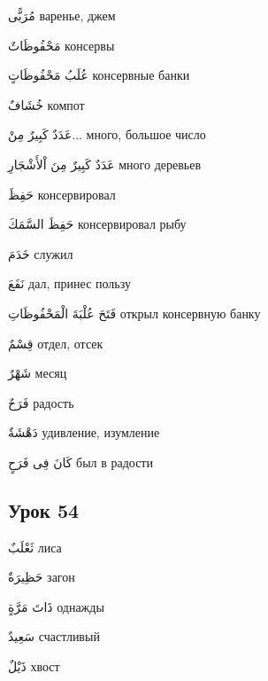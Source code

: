 \documentclass[a5paper]{article}
\newcommand\textstyleDropCaps[1]{#1}
\newcommand\textstyleCaptioncharacters[1]{#1}
\begin{document}
\textstyleCaptioncharacters{مُرَبًّى }\textstyleDropCaps{варенье, джем‎}

\textstyleCaptioncharacters{مَحْفُوظَاتٌ }\textstyleDropCaps{консервы‎}

\textstyleCaptioncharacters{عُلَبُ مَحْفُوظَاتٍ }\textstyleDropCaps{кон­сервные банки‎}

\textstyleCaptioncharacters{خُشَافٌ }\textstyleDropCaps{компот‎}

\textstyleCaptioncharacters{عَدَدٌ كَبِيرٌ مِنْ...ِ }\textstyleDropCaps{много, большое число‎}

\textstyleCaptioncharacters{عَدَدٌ كَبِيرٌ مِنَ اْلأَشْجَارِ }\textstyleDropCaps{много деревьев‎}

\textstyleCaptioncharacters{حَفِظَ }\textstyleDropCaps{консервировал‎}

\textstyleCaptioncharacters{حَفِظَ السَّمَكَ }\textstyleDropCaps{консер­вировал рыбу‎}

\textstyleCaptioncharacters{خَدَمَ }\textstyleDropCaps{служил‎}

\textstyleCaptioncharacters{نَفَعَ }\textstyleDropCaps{дал, принес пользу‎}

\textstyleCaptioncharacters{فَتَحَ عُلْبَةَ الْمَحْفُوظَاتِ }\textstyleDropCaps{открыл консервную банку‎}

\textstyleCaptioncharacters{قِسْمٌ }\textstyleDropCaps{отдел, отсек‎}

\textstyleCaptioncharacters{شَهْرٌ }\textstyleDropCaps{месяц‎}

\textstyleCaptioncharacters{فَرَحٌ }\textstyleDropCaps{радость‎}

\textstyleCaptioncharacters{دَهْشَةٌ }\textstyleDropCaps{удивление, изум­ление‎}

\textstyleCaptioncharacters{كَانَ فِى فَرَحٍ }\textstyleDropCaps{был в ра­дости‎}

\subsection[Урок 54‎]{\textstyleDropCaps{Урок 54‎}}
\textstyleCaptioncharacters{ثَعْلَبٌ }\textstyleDropCaps{лиса‎}

\textstyleCaptioncharacters{حَظِيرَةٌ }\textstyleDropCaps{загон‎}

\textstyleCaptioncharacters{ذَاتَ مَرَّةٍ }\textstyleDropCaps{однажды‎}

\textstyleCaptioncharacters{سَعِيدٌ }\textstyleDropCaps{счастливый‎}

\textstyleCaptioncharacters{ذَيْلٌ }\textstyleDropCaps{хвост‎}
\end{document}
